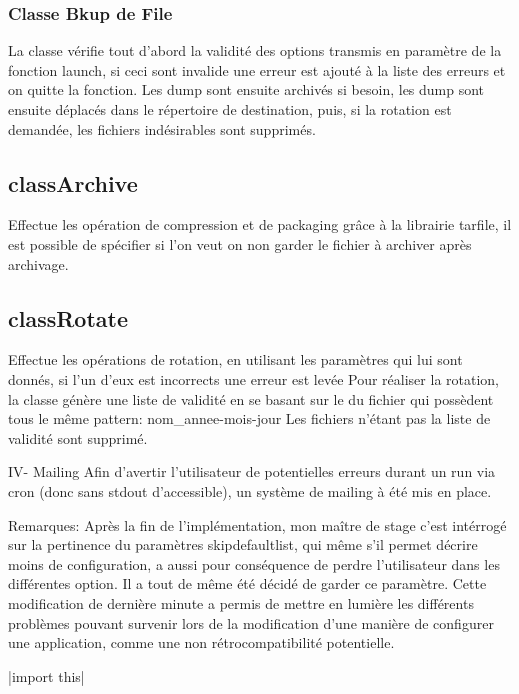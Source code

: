 \subsubsection*{Classe Bkup de File}
La classe vérifie tout d'abord la validité des options transmis en paramètre de la fonction launch, si ceci sont invalide une erreur est ajouté à la liste des erreurs et on quitte la fonction.
Les dump sont ensuite archivés si besoin, les dump sont ensuite déplacés dans le répertoire de destination, puis, si la rotation est demandée, les fichiers indésirables sont supprimés.


\subsection*{classArchive}
Effectue les opération de compression et de packaging grâce à la librairie tarfile, il est possible de spécifier si l'on veut on non garder le fichier à archiver après archivage.

\subsection*{classRotate}
Effectue les opérations de rotation, en utilisant les paramètres qui lui sont donnés, si l'un d'eux est incorrects une erreur est levée
Pour réaliser la rotation, la classe génère une liste de validité en se basant sur le du fichier qui possèdent tous le même pattern: nom\_annee-mois-jour
Les fichiers n'étant pas la liste de validité sont supprimé.


IV- Mailing
	Afin d'avertir l'utilisateur de potentielles erreurs durant un run via cron (donc sans stdout d'accessible), un système de mailing à été mis en place.

Remarques:
Après la fin de l'implémentation, mon maître de stage c'est intérrogé sur la pertinence du paramètres skipdefaultlist, qui même s'il permet décrire moins de configuration, a aussi pour conséquence de perdre l'utilisateur dans les différentes option.
Il a tout de même été décidé de garder ce paramètre. Cette modification de dernière minute a permis de mettre en lumière les différents problèmes pouvant survenir lors de la modification d'une manière de configurer une application, comme une non rétrocompatibilité potentielle.

|import this|